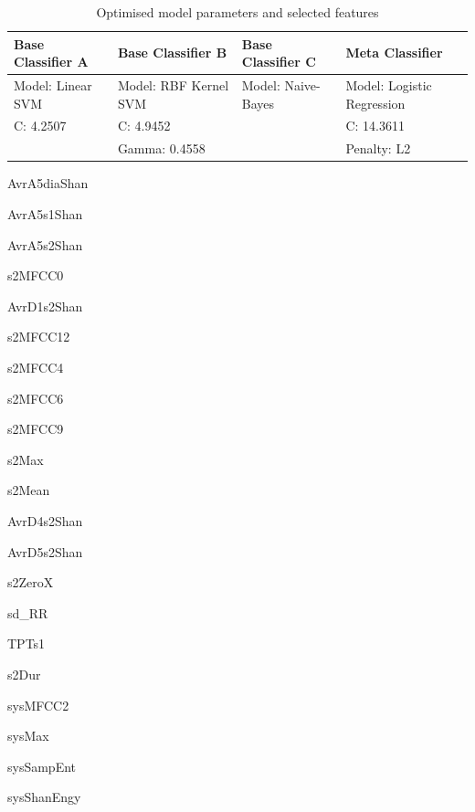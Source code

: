 \documentclass[titlepage, 12pt]{scrartcl} \usepackage{enumitem}
\begin{document}
\renewenvironment{itemize}{
  \begin{list}{}{
    \setlength{\leftmargin}{1.5em}
    \setlength{\itemsep}{0.25em}
    \setlength{\parskip}{0pt}
    \setlength{\parsep}{0.25em}
  }
}{
  \end{list}
}


\begin{table}[H]
\centering
\caption{Optimised model parameters and selected features}
\scriptsize
\label{OpParam}
\begin{tabulary}{\linewidth}{LLLL}
\toprule
Base Classifier A & Base Classifier B     & Base Classifier C  & Meta Classifier            \\ \midrule
Model: Linear SVM & Model: RBF Kernel SVM & Model: Naive-Bayes & Model: Logistic Regression \\
C: 4.2507         & C: 4.9452             &                    & C: 14.3611                 \\
                  & Gamma: 0.4558         &                    & Penalty: L2                \\ \bottomrule
\end{tabulary}
\singlespacing
\begin{multicols}{5}
    \scriptsize
\begin{itemize}
    \item AvrA5diaShan
    \item AvrA5s1Shan
    \item AvrA5s2Shan
    \item s2MFCC0
    \item AvrD1s2Shan
    \item s2MFCC12
    \item s2MFCC4
    \item s2MFCC6
    \item s2MFCC9
    \item s2Max
    \item s2Mean
    \item AvrD4s2Shan
    \item AvrD5s2Shan
    \item s2ZeroX
    \item sd\_RR
    \item TPTs1
    \item s2Dur
    \item sysMFCC2
    \item sysMax
    \item sysSampEnt
    \item sysShanEngy

\end{itemize}
\end{multicols}
\end{table}
\end{document}
